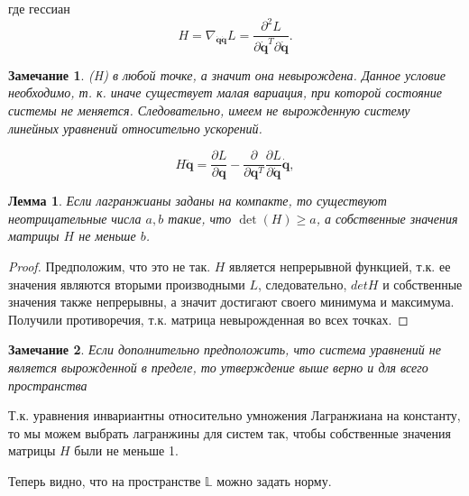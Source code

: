 \documentclass[12pt, twoside]{article}
\newtheorem{remark}{Замечание}
\newtheorem{lemma}{Лемма}
\begin{document}
где гессиан 
\begin{equation}
H = \nabla_{\dot{\mathbf{q}}\dot{\mathbf{q}}} L = \frac{\partial^{2} L}{\partial \dot{\mathbf{q}}^T \partial \dot{\mathbf{q}}}.
\end{equation}
\begin{remark} \label{remark1}
\det(H)  в любой точке, а значит она невырождена. Данное условие необходимо, т. к. иначе существует малая вариация, при которой состояние системы не меняется. Следовательно, имеем не вырожденную систему линейных уравнений относительно ускорений.

\begin{equation}
\label{eq:linear_equation_acc}
H\ddot{\mathbf{q}} 
= \frac{\partial L}{\partial \mathbf{q}}-\frac{\partial}{\partial \mathbf{q}^T} \frac{\partial L}{\partial \dot{\mathbf{q}}} \dot{\mathbf{q}},
\end{equation}

\end{remark}

\begin{lemma} \label{lemma1}
Если лагранжианы заданы на компакте, то существуют неотрицательные числа $a, b$ такие, что \(\det(H) \ge a\), а собственные значения матрицы $H$ не меньше $b$.
\end{lemma}
\begin{proof}
Предположим, что это не так. $H$ является непрерывной функцией, т.к. ее значения являются вторыми производными $L$, следовательно, $det H$ и собственные значения также непрерывны, а значит достигают своего минимума и максимума. Получили противоречия, т.к. матрица невырожденная во всех точках.
\end{proof}

\begin{remark} \label{remark2}
Если дополнительно предположить, что система уравнений не является вырожденной в пределе, то утверждение выше верно и для всего пространства
\end{remark}

Т.к. уравнения инвариантны относительно умножения Лагранжиана на константу, то мы можем выбрать лагранжины для систем так, чтобы собственные значения матрицы $H$ были не меньше 1.

Теперь видно, что на пространстве $\mathbb{L}$ можно задать норму. 
\end{document}
